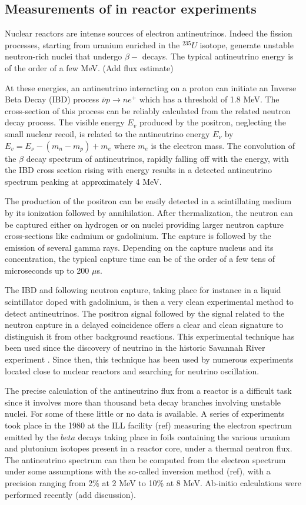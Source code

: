 \subsection{Measurements of \thint in reactor experiments}

Nuclear reactors are intense sources of electron antineutrinos. Indeed the fission processes, starting from uranium enriched in the $^{235}U$ isotope, generate unstable neutron-rich nuclei that undergo $\beta -$ decays. The typical antineutrino energy is of the order of a few MeV. (Add flux estimate)

At these energies, an antineutrino interacting on a proton can initiate an Inverse Beta Decay (IBD) process $\bar{\nu} p \rightarrow n e^+$ which has a threshold of 1.8 MeV. The cross-section of this process can be reliably calculated from the related neutron decay process. The visible energy $E_v$ produced by the positron, neglecting the small nuclear recoil, is related to the antineutrino energy $E_\nu$ by $E_v =  E_{\nu} -(m_n - m_p) + m_e$ where $m_e$ is the electron mass. The convolution of the $\beta$ decay spectrum of antineutrinos, rapidly falling off with the energy, with the IBD cross section rising with energy results in a detected antineutrino spectrum peaking at approximately 4 MeV. 

The production of the positron can be easily detected in a scintillating medium by its ionization followed by annihilation. After thermalization, the neutron can be captured either on hydrogen or on nuclei providing larger neutron capture cross-sections like cadmium or gadolinium. The capture is followed by the emission of several gamma rays. Depending on the capture nucleus and its concentration, the typical capture time can be of the order of a few tens of microseconds up to 200 $\mu $s.

The IBD and following neutron capture, taking place for instance in a liquid scintillator doped with gadolinium, is then a very clean experimental method to detect antineutrinos. The positron signal followed by the signal related to the neutron capture in a delayed coincidence offers a clear and clean signature to distinguish it from other background reactions. This experimental technique has been used since the discovery of neutrino in the historic Savannah River experiment \cite{reines56}. Since then, this technique has been used by numerous experiments located close to nuclear reactors and searching for neutrino oscillation.

The precise calculation of the antineutrino flux from a reactor is a difficult task since it involves more than thousand beta decay branches involving unstable nuclei. For some of these little or no data is available. A series of experiments took place in the 1980 at the ILL facility (ref) measuring the electron spectrum emitted by the $beta$ decays taking place in foils containing the various uranium and plutonium isotopes present in a reactor core, under a thermal neutron flux. The antineutrino spectrum can then be computed from the electron spectrum under some assumptions with the so-called inversion method (ref), with a precision ranging from 2\% at 2 MeV to 10\% at 8 MeV. Ab-initio calculations were performed recently (add discussion).   

